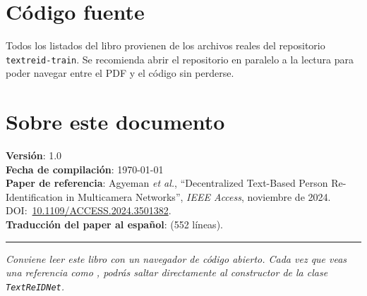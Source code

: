 \section{Código fuente}

Todos los listados del libro provienen de los archivos reales del
repositorio \texttt{textreid-train}. Se recomienda abrir el repositorio
en paralelo a la lectura para poder navegar entre el PDF y el código
sin perderse.

\begin{center}
\end{center}

\section*{Sobre este documento}

\noindent\textbf{Versión}: 1.0\\
\textbf{Fecha de compilación}: \today\\
\textbf{Paper de referencia}: Agyeman \emph{et al.}, ``Decentralized
Text-Based Person Re-Identification in Multicamera Networks'',
\emph{IEEE Access}, noviembre de 2024. DOI:~\href{https://doi.org/10.1109/ACCESS.2024.3501382}{10.1109/ACCESS.2024.3501382}.\\
\textbf{Traducción del paper al español}:
 (552 líneas).

\vspace{1em}
\noindent\rule{\textwidth}{0.4pt}
\vspace{0.5em}

\noindent\textit{Conviene leer este libro con un navegador de código
abierto. Cada vez que veas una referencia como
, podrás saltar directamente al
constructor de la clase \texttt{TextReIDNet}.}
